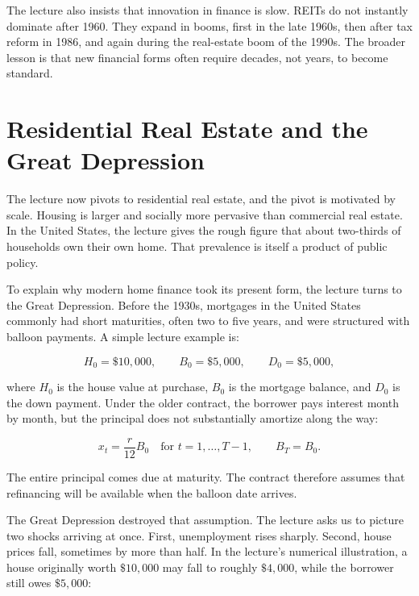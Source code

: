 The lecture also insists that innovation in finance is slow. REITs do not instantly dominate after 1960. They expand in booms, first in the late 1960s, then after tax reform in 1986, and again during the real-estate boom of the 1990s. The broader lesson is that new financial forms often require decades, not years, to become standard.

\section{Residential Real Estate and the Great Depression}

The lecture now pivots to residential real estate, and the pivot is motivated by scale. Housing is larger and socially more pervasive than commercial real estate. In the United States, the lecture gives the rough figure that about two-thirds of households own their own home. That prevalence is itself a product of public policy.

To explain why modern home finance took its present form, the lecture turns to the Great Depression. Before the 1930s, mortgages in the United States commonly had short maturities, often two to five years, and were structured with balloon payments. A simple lecture example is:

\begin{equation}
H_0 = \$10{,}000, \qquad B_0 = \$5{,}000, \qquad D_0 = \$5{,}000,
\end{equation}

where \(H_0\) is the house value at purchase, \(B_0\) is the mortgage balance, and \(D_0\) is the down payment. Under the older contract, the borrower pays interest month by month, but the principal does not substantially amortize along the way:

\begin{equation}
x_t = \frac{r}{12} B_0 \quad \text{for } t=1,\dots,T-1,
\qquad
B_T = B_0.
\end{equation}

The entire principal comes due at maturity. The contract therefore assumes that refinancing will be available when the balloon date arrives.

The Great Depression destroyed that assumption. The lecture asks us to picture two shocks arriving at once. First, unemployment rises sharply. Second, house prices fall, sometimes by more than half. In the lecture's numerical illustration, a house originally worth \(\$10{,}000\) may fall to roughly \(\$4{,}000\), while the borrower still owes \(\$5{,}000\):

